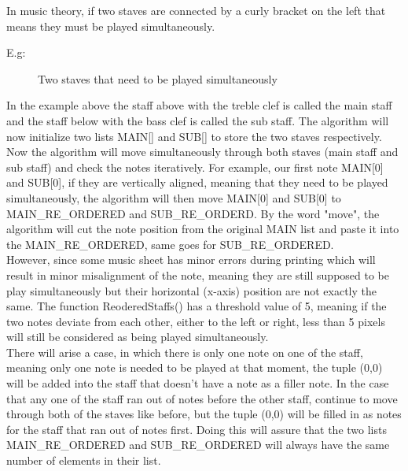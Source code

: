 \documentclass[a4paper,12pt]{report}
\begin{document}
\clearpage

In music theory, if two staves are connected by a curly bracket on the left
that means they must be played simultaneously.

E.g:\\ 
\begin{figure}[h]
\caption{Two staves that need to be played simultaneously}
\label{fig:two staves}
\end{figure}


In the example above the staff above with the treble clef is called the main
staff and the staff below with the bass clef is called the sub staff. The
algorithm will now initialize two lists MAIN[] and SUB[] to store the two staves
respectively.\\

Now the algorithm will move simultaneously through both staves (main staff and sub staff) and check the
notes iteratively. For example, our first note MAIN[0] and SUB[0], if they
are vertically aligned, meaning that they need to be played simultaneously,
the algorithm will then move MAIN[0] and SUB[0] to MAIN\_RE\_ORDERED and
SUB\_RE\_ORDERD. By the word "move", the algorithm will cut the note
position from the original MAIN list and paste it into the
MAIN\_RE\_ORDERED, same goes for SUB\_RE\_ORDERED.\\

However, since some music sheet has  minor errors during printing which will result in minor
misalignment of the note, meaning they are still supposed to be play
simultaneously but their horizontal (x-axis) position are not exactly the
same. The function ReoderedStaffs() has a threshold value of 5, meaning if
the two notes deviate from each other, either to the left or right, less than
5 pixels will still be considered as being played simultaneously.\\

There will arise a case, in which there is only one note on one of the staff, meaning
only one note is needed to be played at that moment, the tuple (0,0) will be added
into the staff that doesn't have a note as a filler note. In the case that any one of the
staff ran out of notes before the other staff, continue to move through both of the
staves like before, but the tuple (0,0) will be filled in as notes for the staff that ran out of notes first.
Doing this will assure that the two lists MAIN\_RE\_ORDERED and SUB\_RE\_ORDERED will
always have the same number of elements in their list.\\
\end{document}
